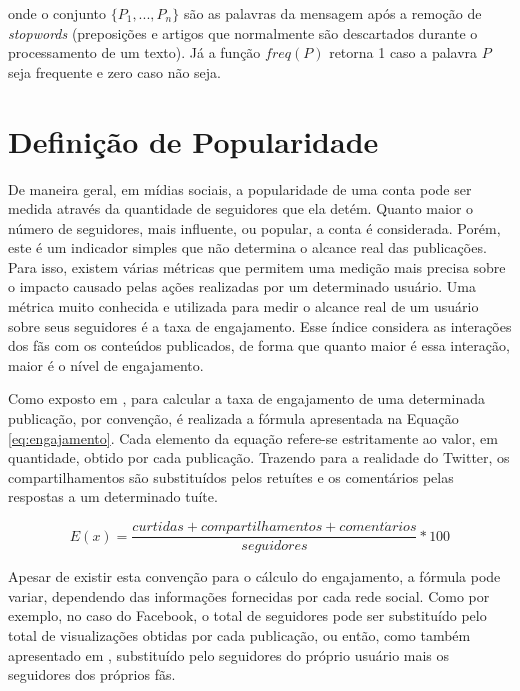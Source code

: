 \documentclass[oneside,openright,12pt]{ufsm_2015} %
\begin{document}
    \par onde o conjunto $\{P_1, ..., P_n\}$ são as palavras da mensagem após a remoção de \textit{stopwords} (preposições e artigos que normalmente são descartados durante o processamento de um texto). Já a função $freq(P)$ retorna 1 caso a palavra $P$ seja frequente e zero caso não seja.


\section{Definição de Popularidade}
\label{sec:prop-def-popularidade}

    \par De maneira geral, em mídias sociais, a popularidade de uma conta pode ser medida através da quantidade de seguidores que ela detém. Quanto maior o número de seguidores, mais influente, ou popular, a conta é considerada. Porém, este é um indicador simples que não determina o alcance real das publicações. Para isso, existem várias métricas que permitem uma medição mais precisa sobre o impacto causado pelas ações realizadas por um determinado usuário. Uma métrica muito conhecida e utilizada para medir o alcance real de um usuário sobre seus seguidores é a taxa de engajamento. Esse índice considera as interações dos fãs com os conteúdos publicados, de forma que quanto maior é essa interação, maior é o nível de engajamento.

    \par Como exposto em \cite{pillat:17}, para calcular a taxa de engajamento de uma determinada publicação, por convenção, é realizada a fórmula apresentada na Equação \ref{eq:engajamento}. Cada elemento da equação refere-se estritamente ao valor, em quantidade, obtido por cada publicação. Trazendo para a realidade do Twitter, os compartilhamentos são substituídos pelos retuítes e os comentários pelas respostas a um determinado tuíte.
    
    \begin{equation} \label{eq:engajamento}
    E(x) = \frac{curtidas + compartilhamentos + coment\acute{a}rios}{seguidores}*100
    \end{equation}
    
    \par Apesar de existir esta convenção para o cálculo do engajamento, a fórmula pode variar, dependendo das informações fornecidas por cada rede social. Como por exemplo, no caso do Facebook, o total de seguidores pode ser substituído pelo total de visualizações obtidas por cada publicação, ou então, como também apresentado em \cite{pillat:17}, substituído pelo seguidores do próprio usuário mais os seguidores dos próprios fãs.
\end{document}
